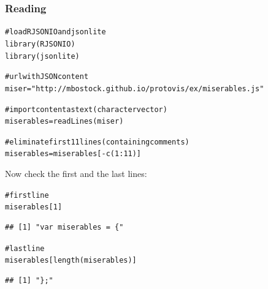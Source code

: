 \documentclass{beamer}\usepackage[]{graphicx}\usepackage[]{color}
\makeatletter
\newcommand{\hlnum}[1]{\textcolor[rgb]{0.063,0.58,0.627}{#1}}%
\newcommand{\hlstr}[1]{\textcolor[rgb]{0.063,0.58,0.627}{#1}}%
\newcommand{\hlcom}[1]{\textcolor[rgb]{0.588,0.588,0.588}{#1}}%
\newcommand{\hlopt}[1]{\textcolor[rgb]{0.196,0.196,0.196}{#1}}%
\newcommand{\hlstd}[1]{\textcolor[rgb]{0.196,0.196,0.196}{#1}}%
\newcommand{\hlkwb}[1]{\textcolor[rgb]{0.627,0,0.314}{#1}}%
\newcommand{\hlkwd}[1]{\textcolor[rgb]{0.78,0.227,0.412}{#1}}%
\newenvironment{kframe}{%
 \def\at@end@of@kframe{}%
 \ifinner\ifhmode%
  \def\at@end@of@kframe{\end{minipage}}%
  \begin{minipage}{\columnwidth}%
 \fi\fi%
 \def\FrameCommand##1{\hskip\@totalleftmargin \hskip-\fboxsep
 \colorbox{shadecolor}{##1}\hskip-\fboxsep
     \hskip-\linewidth \hskip-\@totalleftmargin \hskip\columnwidth}%
 \MakeFramed {\advance\hsize-\width
   \@totalleftmargin\z@ \linewidth\hsize
   \@setminipage}}%
 {\par\unskip\endMakeFramed%
 \at@end@of@kframe}
\newenvironment{knitrout}{}{} %
\makeatother
\begin{document}
\begin{frame}[fragile]
\frametitle{Reading }

\begin{knitrout}\tiny
{}\color{fgcolor}\begin{kframe}
\begin{alltt}
\hlcom{# load RJSONIO and jsonlite}
\hlkwd{library}\hlstd{(RJSONIO)}
\hlkwd{library}\hlstd{(jsonlite)}

\hlcom{# url with JSON content}
\hlstd{miser} \hlkwb{=} \hlstr{"http://mbostock.github.io/protovis/ex/miserables.js"}

\hlcom{# import content as text (character vector)}
\hlstd{miserables} \hlkwb{=} \hlkwd{readLines}\hlstd{(miser)}

\hlcom{# eliminate first 11 lines (containing comments)}
\hlstd{miserables} \hlkwb{=} \hlstd{miserables[}\hlopt{-}\hlkwd{c}\hlstd{(}\hlnum{1}\hlopt{:}\hlnum{11}\hlstd{)]}
\end{alltt}
\end{kframe}
\end{knitrout}



Now check the first and the last lines:

\begin{knitrout}\tiny
{}\color{fgcolor}\begin{kframe}
\begin{alltt}
\hlcom{# first line}
\hlstd{miserables[}\hlnum{1}\hlstd{]}
\end{alltt}
\begin{verbatim}
## [1] "var miserables = {"
\end{verbatim}
\begin{alltt}
\hlcom{# last line}
\hlstd{miserables[}\hlkwd{length}\hlstd{(miserables)]}
\end{alltt}
\begin{verbatim}
## [1] "};"
\end{verbatim}
\end{kframe}
\end{knitrout}

\end{frame}

\end{document}
